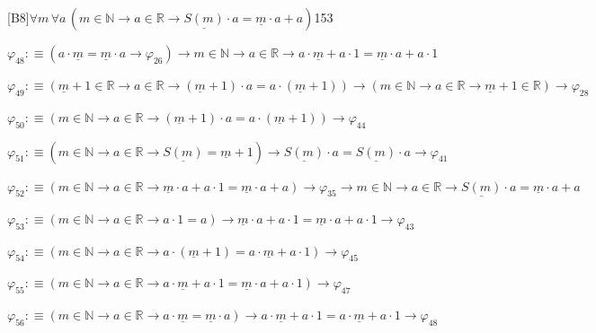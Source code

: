 \begin{fullproof}{[B8]}{$\forall m\,\forall a\,(m \in \mathbb{N} \to a \in \mathbb{R} \to \underline{S(m)} \cdot a = \underline{m} \cdot a + a)$}{153}
\begin{abbrevlist}
\item $\varphi_{48} :\equiv (a \cdot \underline{m} = \underline{m} \cdot a \to \varphi_{26}) \to m \in \mathbb{N} \to a \in \mathbb{R} \to a \cdot \underline{m} + a \cdot 1 = \underline{m} \cdot a + a \cdot 1$
\item $\varphi_{49} :\equiv (\underline{m} + 1 \in \mathbb{R} \to a \in \mathbb{R} \to (\underline{m} + 1) \cdot a = a \cdot (\underline{m} + 1)) \to (m \in \mathbb{N} \to a \in \mathbb{R} \to \underline{m} + 1 \in \mathbb{R}) \to \varphi_{28}$
\item $\varphi_{50} :\equiv (m \in \mathbb{N} \to a \in \mathbb{R} \to (\underline{m} + 1) \cdot a = a \cdot (\underline{m} + 1)) \to \varphi_{44}$
\item $\varphi_{51} :\equiv (m \in \mathbb{N} \to a \in \mathbb{R} \to \underline{S(m)} = \underline{m} + 1) \to \underline{S(m)} \cdot a = \underline{S(m)} \cdot a \to \varphi_{41}$
\item $\varphi_{52} :\equiv (m \in \mathbb{N} \to a \in \mathbb{R} \to \underline{m} \cdot a + a \cdot 1 = \underline{m} \cdot a + a) \to \varphi_{35} \to m \in \mathbb{N} \to a \in \mathbb{R} \to \underline{S(m)} \cdot a = \underline{m} \cdot a + a$
\item $\varphi_{53} :\equiv (m \in \mathbb{N} \to a \in \mathbb{R} \to a \cdot 1 = a) \to \underline{m} \cdot a + a \cdot 1 = \underline{m} \cdot a + a \cdot 1 \to \varphi_{43}$
\item $\varphi_{54} :\equiv (m \in \mathbb{N} \to a \in \mathbb{R} \to a \cdot (\underline{m} + 1) = a \cdot \underline{m} + a \cdot 1) \to \varphi_{45}$
\item $\varphi_{55} :\equiv (m \in \mathbb{N} \to a \in \mathbb{R} \to a \cdot \underline{m} + a \cdot 1 = \underline{m} \cdot a + a \cdot 1) \to \varphi_{47}$
\item $\varphi_{56} :\equiv (m \in \mathbb{N} \to a \in \mathbb{R} \to a \cdot \underline{m} = \underline{m} \cdot a) \to a \cdot \underline{m} + a \cdot 1 = a \cdot \underline{m} + a \cdot 1 \to \varphi_{48}$
\end{abbrevlist}
\end{fullproof}
